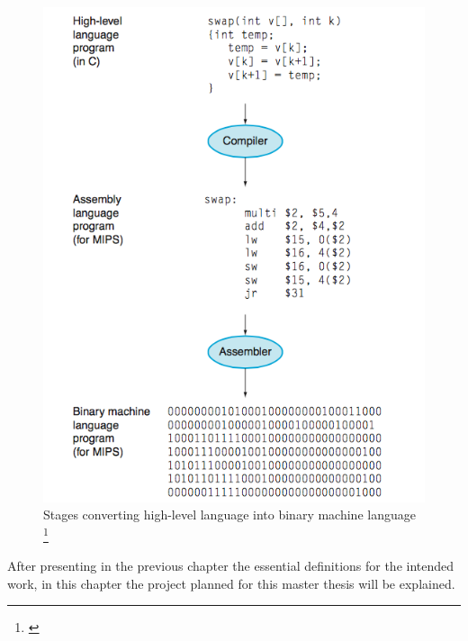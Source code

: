 \documentclass[
  oneside,
  11pt, a4paper,
  footinclude=true,
  headinclude=true,
  cleardoublepage=empty
]{scrbook}
\begin{document}
\begin{figure}[h!]
  \centering
    \includegraphics[height=0.9\textwidth]{img/high-level-2-low-level.png}
    \caption{Stages converting high-level language into binary machine language \protect\footnote{\cite{DAPJLH}}}
    \label{fig:hl2ll}
\end{figure}







After presenting in the previous chapter the essential definitions for the intended work, in this chapter the project planned for this master thesis will be explained.

\end{document}
